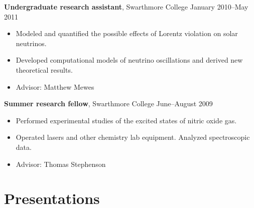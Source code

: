 \documentclass[letterpaper,10pt]{article}
\newcommand{\entry}[3]{\vspace{.5em plus .1em minus .1em}\textbf{#1}, #2 \hfill #3}
\begin{document}
\entry{Undergraduate research assistant}{Swarthmore College}{January 2010--May 2011}

\begin{itemize}
  \item Modeled and quantified the possible effects of Lorentz violation on solar neutrinos.
  \item Developed computational models of neutrino oscillations and derived new theoretical results.
  \item Advisor: Matthew Mewes
\end{itemize}

\entry{Summer research fellow}{Swarthmore College}{June--August 2009}

\begin{itemize}
  \item Performed experimental studies of the excited states of nitric oxide gas.
  \item Operated lasers and other chemistry lab equipment.
    Analyzed spectroscopic data.
  \item Advisor: Thomas Stephenson
\end{itemize}

\pagebreak


\nocite{*}
{\raggedright\printbibliography[heading=bibintoc, title={Publications}]}


\section{Presentations}
\end{document}
